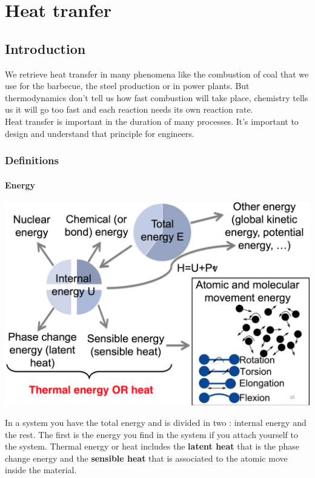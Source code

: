 
\chapter{Heat tranfer}
\section{Introduction}
	We retrieve heat transfer in many phenomena like the combustion of coal that we use for the barbecue, the steel production or in power plants. But thermodynamics don't tell us how fast combustion will take place, chemistry tells us it will go too fast and each reaction needs its own reaction rate. \\
	Heat transfer is important in the duration of many processes. It's important to design and understand that principle for engineers. 
	
	\subsection{Definitions}
	\subsubsection{Energy}
		\begin{center}
		\includegraphics[scale=0.25]{ch3/1}
		\end{center}
		In a system you have the total energy and is divided in two : internal energy and the rest. The first is the energy you find in the system if you attach yourself to the system. Thermal energy or heat includes the \textbf{latent heat} that is the phase change energy and the \textbf{sensible heat} that is associated to the atomic move inside the material. 
		

